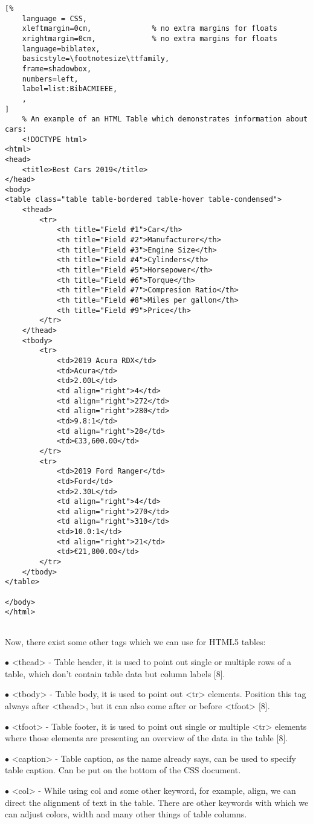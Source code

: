 \begin{lstlisting}[%
    language = CSS, 
    xleftmargin=0cm,              % no extra margins for floats
    xrightmargin=0cm,             % no extra margins for floats
    language=biblatex,
    basicstyle=\footnotesize\ttfamily,
    frame=shadowbox,
    numbers=left,
    label=list:BibACMIEEE,
    ,
]
    % An example of an HTML Table which demonstrates information about cars:
    <!DOCTYPE html>
<html>
<head>
	<title>Best Cars 2019</title>
</head>
<body>
<table class="table table-bordered table-hover table-condensed">
	<thead>
		<tr>
			<th title="Field #1">Car</th>
			<th title="Field #2">Manufacturer</th>
			<th title="Field #3">Engine Size</th>
			<th title="Field #4">Cylinders</th>
			<th title="Field #5">Horsepower</th>
			<th title="Field #6">Torque</th>
			<th title="Field #7">Compresion Ratio</th>
			<th title="Field #8">Miles per gallon</th>
			<th title="Field #9">Price</th>
		</tr>
	</thead>
	<tbody>
		<tr>
			<td>2019 Acura RDX</td>
			<td>Acura</td>
			<td>2.00L</td>
			<td align="right">4</td>
			<td align="right">272</td>
			<td align="right">280</td>
			<td>9.8:1</td>
			<td align="right">28</td>
			<td>€33,600.00</td>
		</tr>
		<tr>
			<td>2019 Ford Ranger</td>
			<td>Ford</td>
			<td>2.30L</td>
			<td align="right">4</td>
			<td align="right">270</td>
			<td align="right">310</td>
			<td>10.0:1</td>
			<td align="right">21</td>
			<td>€21,800.00</td>
		</tr>
	</tbody>
</table>

</body>
</html>
    
\end{lstlisting}

Now, there exist some other tags which we can use for HTML5 tables:

$\bullet$ <thead> - Table header, it is used to point out single or multiple rows 
of a table, which don't contain table data but column labels [8].

$\bullet$ <tbody> - Table body, it is used to point out <tr> elements. Position this tag
always after <thead>, but it can also come after or before <tfoot> [8].

$\bullet$ <tfoot> - Table footer, it is used to point out single or multiple <tr> elements
where those elements are presenting an overview  of the data in the table [8]. 

$\bullet$ <caption> - Table caption, as the name already says, can be used to specify table caption.
Can be put on the bottom of the CSS document.

$\bullet$ <col> - While using col and some other keyword, for example, align, we can direct
the alignment of text in the table. There are other keywords with which we can adjust colors, width
and many other things of table columns.  

